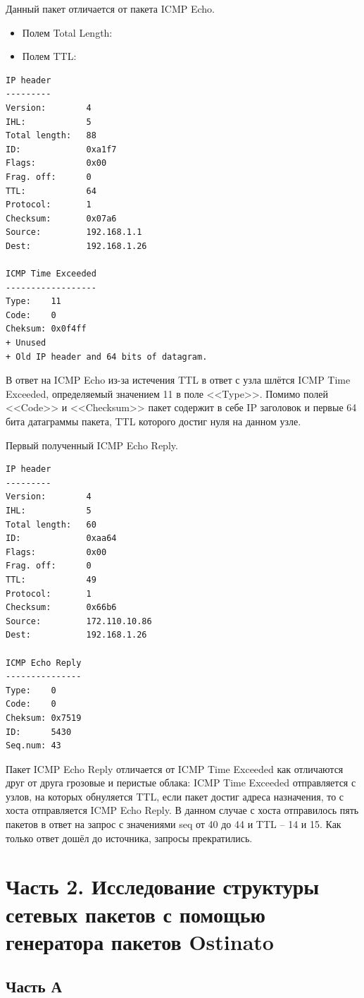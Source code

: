 \documentclass[12pt, a4paper] {ncc}
\begin{document}
Данный пакет отличается от пакета ICMP Echo.
\begin{itemize}
	\item Полем Total Length:
	\item Полем TTL:
\end{itemize}

\begin{verbatim}
IP header
---------
Version:        4
IHL:            5
Total length:   88
ID:             0xa1f7
Flags:          0x00
Frag. off:      0
TTL:            64
Protocol:       1
Checksum:       0x07a6
Source:         192.168.1.1
Dest:           192.168.1.26

ICMP Time Exceeded
------------------
Type:    11
Code:    0
Cheksum: 0x0f4ff
+ Unused
+ Old IP header and 64 bits of datagram.
\end{verbatim}

В ответ на ICMP Echo из-за истечения TTL в ответ с узла шлётся ICMP Time Exceeded,
определяемый значением 11 в поле <<Type>>. Помимо полей <<Code>> и <<Checksum>>
пакет содержит в себе IP заголовок и первые 64 бита датаграммы пакета, TTL которого
достиг нуля на данном узле.

Первый полученный ICMP Echo Reply.
\begin{verbatim}
IP header
---------
Version:        4
IHL:            5
Total length:   60
ID:             0xaa64
Flags:          0x00
Frag. off:      0
TTL:            49
Protocol:       1
Checksum:       0x66b6
Source:         172.110.10.86
Dest:           192.168.1.26

ICMP Echo Reply
---------------
Type:    0
Code:    0
Cheksum: 0x7519
ID:      5430
Seq.num: 43
\end{verbatim}

Пакет ICMP Echo Reply отличается от ICMP Time Exceeded как отличаются друг от друга грозовые и
перистые облака: ICMP Time Exceeded отправляется с узлов, на которых обнуляется TTL, если
пакет достиг адреса назначения, то с хоста отправляется ICMP Echo Reply. В данном случае
с хоста отправилось пять пакетов в ответ на запрос с значениями seq от 40 до 44 и
TTL -- 14 и 15. Как только ответ дошёл до источника, запросы прекратились.

\section*{Часть 2. Исследование структуры сетевых пакетов с помощью генератора пакетов Ostinato}
\subsection*{Часть А}
\end{document}
